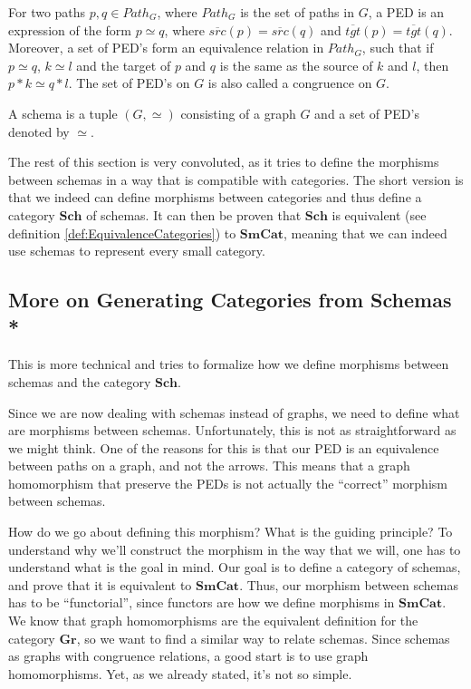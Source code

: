 \begin{definition}
  For two paths $p,q \in Path_G$, where $Path_G$ is the set of paths in $G$, a PED is an expression of the form
  $p \simeq q$, where $\overline{src}(p) = \overline{src}(q)$ and $\overline {tgt}(p)=\overline {tgt}(q)$.
  Moreover, a set of PED's form an equivalence relation in $Path_G$, such that
  if $p \simeq q$, $k \simeq l$ and the target of $p$ and $q$ is the same as the source
  of $k$ and $l$, then $p * k \simeq q * l$.
  The set of PED's on $G$ is also called a congruence on $G$.
\end{definition}

\begin{definition}
  A schema is a tuple $(G, \simeq)$ consisting of a graph $G$ and a set of PED's denoted by $\simeq$.
\end{definition}

The rest of this section is very convoluted, as it tries to define the morphisms between
schemas in a way that is compatible with categories. The short version is that we indeed
can define morphisms between categories and thus define a category $\mathbf{Sch}$ of schemas.
It can then be proven that $\mathbf{Sch}$ is equivalent (see definition \ref{def:EquivalenceCategories}) to 
$\mathbf{SmCat}$, meaning that we can indeed use schemas to represent every small category.

\subsection{More on Generating Categories from Schemas *}

This is more technical and tries to formalize how we define morphisms between schemas and
the category $\mathbf{Sch}$.

Since we are now dealing with schemas instead of graphs, we need to define what are morphisms
between schemas. Unfortunately, this is not as straightforward as we might think. One of the reasons
for this is that our PED is an equivalence between paths on a graph, and not the arrows.
This means that a graph homomorphism that preserve the PEDs is not actually the ``correct''
morphism between schemas.

How do we go about defining this morphism? What is the guiding principle? To understand why
we'll construct the morphism in the way that we will, one has to understand what is the goal in mind.
Our goal is to define a category of schemas, and prove that it is equivalent to $\mathbf{SmCat}$.
Thus, our morphism between schemas has to be ``functorial'', since functors are how we define
morphisms in $\mathbf{SmCat}$. We know that graph homomorphisms are the equivalent definition
for the category $\mathbf{Gr}$, so we want to find a similar way to relate schemas.
Since schemas as graphs with congruence relations, a good start is to use graph homomorphisms.
Yet, as we already stated, it's not so simple.

